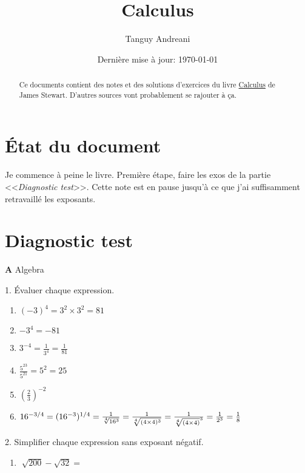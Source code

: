 \documentclass[fleqn,a4paper,nobib]{tufte-handout}
\title{Calculus}
\author{Tanguy Andreani}
\date{Dernière mise à jour: \today}
\begin{document}
\maketitle

\begin{abstract}
    Ce documents contient des notes et des solutions d'exercices
    du livre \underline{Calculus} de James Stewart.
    D'autres sources vont probablement se rajouter à ça.
\end{abstract}

\tableofcontents

\section*{État du document}

Je commence à peine le livre. Première étape, faire les exos
de la partie <<\emph{Diagnostic test}>>. Cette note est en pause
jusqu'à ce que j'ai suffisamment retravaillé les exposants.

\section{Diagnostic test}

\textbf{A} Algebra

1. Évaluer chaque expression.

\begin{enumerate}[label=(\alph{*}),leftmargin=2cm,align=left]
    \item $(-3)^4 = 3^2 \times 3^2 = 81$
    \item $-3^4 = -81$
    \item \(3^{-4} = \frac{1}{3^4} = \frac{1}{81}\)
    \item \(\frac{5^{23}}{5^{21}} = 5^2 = 25\)
    \item $(\frac{2}{3})^{-2}$
    \item \(16^{-3/4} = (16^{-3})^{1/4} = \frac{1}{\sqrt[4]{16^3}}
    = \frac{1}{\sqrt[4]{(4\times4)^3}} = \frac{1}{\sqrt[4]{(4\times4)}^3}
    \linebreak = \frac{1}{2^3} = \frac{1}{8} \)
\end{enumerate}

2. Simplifier chaque expression sans exposant négatif.

\begin{enumerate}[label=(\alph{*}),leftmargin=2cm,align=left]
    \item $\sqrt[]{200} - \sqrt{32} = $
\end{enumerate}
\end{document}
